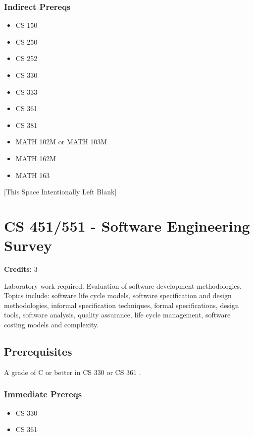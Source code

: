 \documentclass[]{article}
\providecommand{\tightlist}{%
  \setlength{\itemsep}{0pt}\setlength{\parskip}{0pt}}
\newcommand{\pagebreakhere}{
\vspace*{\fill}
\begin{center}
[This Space Intentionally Left Blank]
\end{center}
\vspace*{\fill}
\newpage
}
\begin{document}
\subsubsection{Indirect Prereqs}\label{indirect-prereqs-25}

\begin{itemize}
\tightlist
\item
  CS 150
\item
  CS 250
\item
  CS 252
\item
  CS 330
\item
  CS 333
\item
  CS 361
\item
  CS 381
\item
  MATH 102M or MATH 103M
\item
  MATH 162M
\item
  MATH 163
\end{itemize}

\pagebreakhere
\section{CS 451/551 - Software Engineering
Survey}\label{cs-451551---software-engineering-survey}

\textbf{Credits:} 3

Laboratory work required. Evaluation of software development
methodologies. Topics include: software life cycle models, software
specification and design methodologies, informal specification
techniques, formal specifications, design tools, software analysis,
quality assurance, life cycle management, software costing models and
complexity.

\subsection{Prerequisites}\label{prerequisites-34}

A grade of C or better in CS 330 or CS 361 .

\subsubsection{Immediate Prereqs}\label{immediate-prereqs-26}

\begin{itemize}
\tightlist
\item
  CS 330
\item
  CS 361
\end{itemize}
\end{document}
